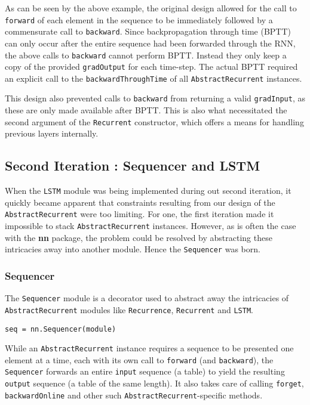 \documentclass{article} %
\providecommand{\inlinecode}[1]{\texttt{#1}}
\begin{document}
As can be seen by the above example, the original design allowed for 
the call to \inlinecode{forward} of each element in the sequence to 
be immediately followed by a commensurate call to \inlinecode{backward}.
Since backpropagation through time (BPTT)\cite{rumelhart2002learning} can only occur after the entire 
sequence had been forwarded through the RNN, the above calls to \inlinecode{backward}
cannot perform BPTT. Instead they only keep a copy of the provided \inlinecode{gradOutput} for each time-step.
The actual BPTT required an explicit call to the \inlinecode{backwardThroughTime} 
of all \inlinecode{AbstractRecurrent} instances. 

This design also prevented calls to \inlinecode{backward} from
returning a valid \inlinecode{gradInput}, as these are only made available after BPTT.
This is also what necessitated the second argument of the \inlinecode{Recurrent} 
constructor, which offers a means for handling previous layers internally.

\subsection{Second Iteration : Sequencer and LSTM}

When the \inlinecode{LSTM} module was being implemented during out second iteration, 
it quickly became apparent that constraints resulting 
from our design of the \inlinecode{AbstractRecurrent} were too limiting.
For one, the first iteration made it impossible to stack \inlinecode{AbstractRecurrent} instances.
However, as is often the case with the \textbf{nn} package, the problem 
could be resolved by abstracting these intricacies away into another module.
Hence the \inlinecode{Sequencer} was born.

\subsubsection{Sequencer}
The \inlinecode{Sequencer} module is a decorator used to abstract 
away the intricacies of \inlinecode{AbstractRecurrent} modules
like \inlinecode{Recurrence}, \inlinecode{Recurrent} and \inlinecode{LSTM}. 

\begin{verbatim}
seq = nn.Sequencer(module)
\end{verbatim}

While an \inlinecode{AbstractRecurrent} instance requires a sequence to be presented one element at a time, 
each with its own call to \inlinecode{forward} (and \inlinecode{backward}), 
the \inlinecode{Sequencer} forwards an entire \inlinecode{input} sequence (a table) 
to yield the resulting \inlinecode{output} sequence (a table of the same length). 
It also takes care of calling \inlinecode{forget}, \inlinecode{backwardOnline} and 
other such \inlinecode{AbstractRecurrent}-specific methods.
\end{document}
